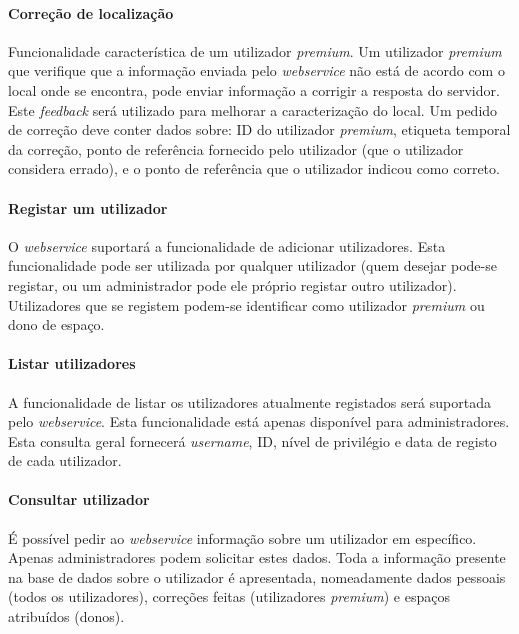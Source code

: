\documentclass[12pt]{article} %
\begin{document}
\paragraph{Correção de localização}
Funcionalidade característica de um utilizador \textit{premium}. Um utilizador \textit{premium} que verifique que a informação enviada pelo \textit{webservice} não está de acordo com o local onde se encontra, pode enviar informação a corrigir a resposta do servidor. Este \textit{feedback} será utilizado para melhorar a caracterização do local. Um pedido de correção deve conter dados sobre: ID do utilizador \textit{premium}, etiqueta temporal da correção, ponto de referência fornecido pelo utilizador (que o utilizador considera errado), e o ponto de referência que o utilizador indicou como correto.

\paragraph{Registar um utilizador}
O \textit{webservice} suportará a funcionalidade de adicionar utilizadores. Esta funcionalidade pode ser utilizada por qualquer utilizador (quem desejar pode-se registar, ou um administrador pode ele próprio registar outro utilizador). Utilizadores que se registem podem-se identificar como utilizador \textit{premium} ou dono de espaço.\par

\paragraph{Listar utilizadores}
A funcionalidade de listar os utilizadores atualmente registados será suportada pelo \textit{webservice}. Esta funcionalidade está apenas disponível para administradores. Esta consulta geral fornecerá \textit{username}, ID, nível de privilégio e data de registo de cada utilizador.\par

\paragraph{Consultar utilizador}
É possível pedir ao \textit{webservice} informação sobre um utilizador em específico. Apenas administradores podem solicitar estes dados. Toda a informação presente na base de dados sobre o utilizador é apresentada, nomeadamente dados pessoais (todos os utilizadores), correções feitas (utilizadores \textit{premium}) e espaços atribuídos (donos).\par
\end{document}
